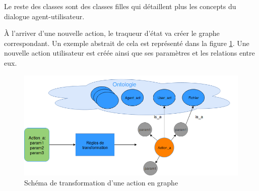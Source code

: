 Le reste des classes sont des classes filles qui détaillent plus les concepts du dialogue agent-utilisateur.
\par À l'arriver d'une nouvelle action, le traqueur d'état va créer le graphe correspondant. Un exemple abstrait de cela est représenté dans la figure \ref{abstract_onto}. Une nouvelle action utilisateur est créée ainsi que ses paramètres et les relations entre eux.
\begin{figure}[H] 
	\centering
	\includegraphics[width=0.88\linewidth]{images/Conception/DM/abstract_onto.png}
	\caption{Schéma de transformation d'une action en graphe}\label{abstract_onto}
	
\end{figure}
